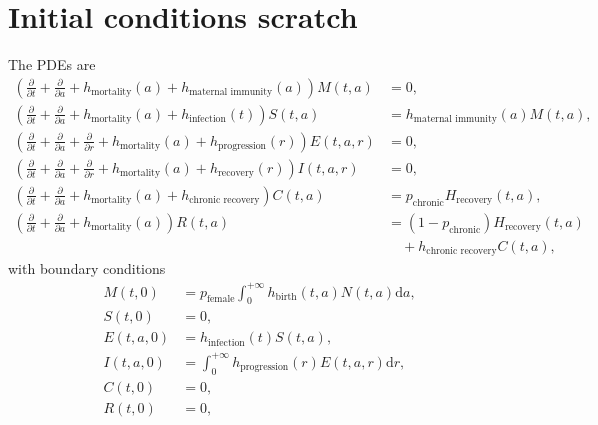 \documentclass[12pt]{article}
\newcommand{\md}{\mathrm{d}}
\begin{document}
\section{Initial conditions scratch}

The PDEs are
\begin{equation}
  \begin{split}
    \left(
      \frac{\partial}{\partial t}
      + \frac{\partial}{\partial a}
      + h_{\text{mortality}}(a)
      + h_{\text{maternal immunity}}(a)
    \right) M(t, a)
    &= 0,
    \\
    \left(
      \frac{\partial}{\partial t}
      + \frac{\partial}{\partial a}
      + h_{\text{mortality}}(a)
      + h_{\text{infection}}(t)
    \right) S(t, a)
    &= h_{\text{maternal immunity}}(a) M(t, a),
    \\
    \left(
      \frac{\partial}{\partial t}
      + \frac{\partial}{\partial a}
      + \frac{\partial}{\partial r}
      + h_{\text{mortality}}(a)
      + h_{\text{progression}}(r)
    \right) E(t, a, r)
    &= 0,
    \\
    \left(
      \frac{\partial}{\partial t}
      + \frac{\partial}{\partial a}
      + \frac{\partial}{\partial r}
      + h_{\text{mortality}}(a)
      + h_{\text{recovery}}(r)
    \right) I(t, a, r)
    &= 0,
    \\
    \left(
      \frac{\partial}{\partial t}
      + \frac{\partial}{\partial a}
      + h_{\text{mortality}}(a)
      + h_{\text{chronic recovery}}
    \right) C(t, a)
    &= p_{\text{chronic}} H_{\text{recovery}}(t, a),
    \\
    \left(
      \frac{\partial}{\partial t}
      + \frac{\partial}{\partial a}
      + h_{\text{mortality}}(a)
    \right) R(t, a)
    &= (1 - p_{\text{chronic}}) H_{\text{recovery}}(t, a)
    \\ & \quad {}
    + h_{\text{chronic recovery}} C(t, a),
  \end{split}
\end{equation}
with boundary conditions
\begin{equation}
  \begin{split}
    M(t, 0)
    &= p_{\text{female}}
    \int_0^{+\infty} h_{\text{birth}}(t, a) N(t, a) \md a,
    \\
    S(t, 0) &= 0,
    \\
    E(t, a, 0)
    &= h_{\text{infection}}(t) S(t, a),
    \\
    I(t, a, 0)
    &= \int_0^{+\infty}h_{\text{progression}}(r) E(t, a, r) \md r,
    \\
    C(t, 0) &= 0,
    \\
    R(t, 0) &= 0,
  \end{split}
\end{equation}
\end{document}
